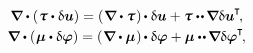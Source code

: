 \vspace{-0.8em}\noindent
{}

\nopagebreak\vspace{-0.2em}\begin{equation*}\begin{array}{c}
\boldnabla \dotp \left( \hspace{.1ex} \forcestresstensor \dotp \variation{\fieldofdisplacements} \right)
= \left( \hspace{.12ex} \boldnabla \dotp \forcestresstensor \hspace{.12ex} \right) \hspace{-0.16ex} \dotp \variation{\fieldofdisplacements}
+ \forcestresstensor \dotdotp \hspace{-0.16ex} \boldnabla \variation{\fieldofdisplacements}^{\hspace{-0.05ex}\T} \hspace{-0.3ex} ,
\\[.25em]
%
\boldnabla \dotp \left( \hspace{.1ex} \couplestresstensor \dotp \variation{\fieldofrotations} \right)
= \left( \hspace{.12ex} \boldnabla \dotp \couplestresstensor \hspace{.12ex} \right) \hspace{-0.16ex} \dotp \variation{\fieldofrotations}
+ \couplestresstensor \dotdotp \hspace{-0.16ex} \boldnabla \variation{\fieldofrotations}^{\hspace{-0.05ex}\T} \hspace{-0.3ex} ,
\end{array}\end{equation*}

\vspace{-0.4em}\noindent
{}

